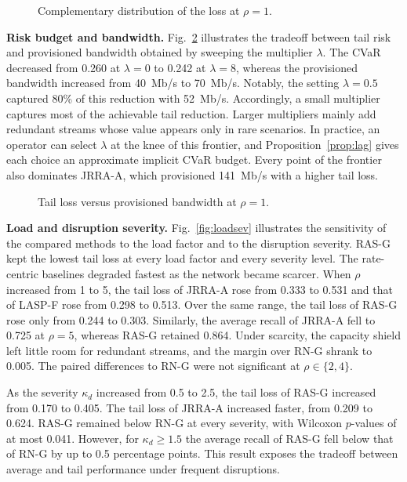 \documentclass[letterpaper,journal]{IEEEtran}
\begin{document}




\begin{figure}[t]
\centering

\caption{Complementary distribution of the loss at $\rho=1$.}
\label{fig:tail}
\end{figure}

\textbf{Risk budget and bandwidth.} Fig.~\ref{fig:pareto} illustrates the tradeoff between tail risk and provisioned bandwidth obtained by sweeping the multiplier $\lambda$. The CVaR decreased from 0.260 at $\lambda=0$ to 0.242 at $\lambda=8$, whereas the provisioned bandwidth increased from 40~Mb/s to 70~Mb/s. Notably, the setting $\lambda=0.5$ captured 80\% of this reduction with 52~Mb/s. Accordingly, a small multiplier captures most of the achievable tail reduction. Larger multipliers mainly add redundant streams whose value appears only in rare scenarios. In practice, an operator can select $\lambda$ at the knee of this frontier, and Proposition~\ref{prop:lag} gives each choice an approximate implicit CVaR budget. Every point of the frontier also dominates JRRA-A, which provisioned 141~Mb/s with a higher tail loss.

\begin{figure}[t]
\centering

\caption{Tail loss versus provisioned bandwidth at $\rho=1$.}
\label{fig:pareto}
\end{figure}

\textbf{Load and disruption severity.} Fig.~\ref{fig:loadsev} illustrates the sensitivity of the compared methods to the load factor and to the disruption severity. RAS-G kept the lowest tail loss at every load factor and every severity level. The rate-centric baselines degraded fastest as the network became scarcer. When $\rho$ increased from 1 to 5, the tail loss of JRRA-A rose from 0.333 to 0.531 and that of LASP-F rose from 0.298 to 0.513. Over the same range, the tail loss of RAS-G rose only from 0.244 to 0.303. Similarly, the average recall of JRRA-A fell to 0.725 at $\rho=5$, whereas RAS-G retained 0.864. Under scarcity, the capacity shield left little room for redundant streams, and the margin over RN-G shrank to 0.005. The paired differences to RN-G were not significant at $\rho\in\{2,4\}$.

As the severity $\kappa_d$ increased from 0.5 to 2.5, the tail loss of RAS-G increased from 0.170 to 0.405. The tail loss of JRRA-A increased faster, from 0.209 to 0.624. RAS-G remained below RN-G at every severity, with Wilcoxon $p$-values of at most 0.041. However, for $\kappa_d\ge1.5$ the average recall of RAS-G fell below that of RN-G by up to 0.5 percentage points. This result exposes the tradeoff between average and tail performance under frequent disruptions.
\end{document}
